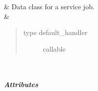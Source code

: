 \documentclass[letterpaper,10pt,english]{sphinxmanual}
\begin{document}
\begin{savenotes}\sphinxatlongtablestart\begin{longtable}[c]{}
\hline

\endfirsthead

%
{}\\
\hline

\endhead

\hline
{}\\
\endfoot

\endlastfoot

\sphinxAtStartPar
{\hyperref[\detokenize{autoapi/pine/backend/job_manager/service/index:pine.backend.job_manager.service.ServiceJob}]{}}
&
\sphinxAtStartPar
Data class for a service job.
\\
\hline
\sphinxAtStartPar
{\hyperref[\detokenize{autoapi/pine/backend/job_manager/service/index:pine.backend.job_manager.service.ServiceManager}]{}}
&
\sphinxAtStartPar
\begin{quote}\begin{description}
\item[{type default\_handler}] \leavevmode
\sphinxAtStartPar
callable

\end{description}\end{quote}

\\
\hline
\end{longtable}\sphinxatlongtableend\end{savenotes}


\subparagraph{Attributes}
\label{\detokenize{autoapi/pine/backend/job_manager/service/index:attributes}}
\end{document}

